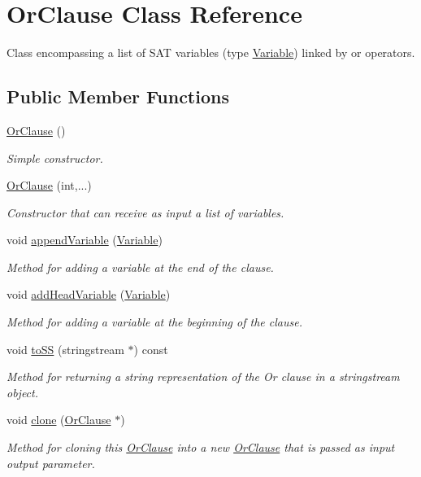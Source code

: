 \hypertarget{classOrClause}{\section{Or\-Clause Class Reference}
\label{classOrClause}
}


Class encompassing a list of S\-A\-T variables (type {\ttfamily \hyperlink{classVariable}{Variable}}) linked by or operators.  


\subsection*{Public Member Functions}
\begin{DoxyCompactItemize}
\item 
\hyperlink{classOrClause_a4631acd310d445535a08e84d51c84f6e}{Or\-Clause} ()
\begin{DoxyCompactList}\small\item\em Simple constructor. \end{DoxyCompactList}\item 
\hyperlink{classOrClause_ae85000bdcd5e0c96cb5369cf4d59240e}{Or\-Clause} (int,...)
\begin{DoxyCompactList}\small\item\em Constructor that can receive as input a list of variables. \end{DoxyCompactList}\item 
void \hyperlink{classOrClause_a09a95fb8ce2a1d10ae7c22295265725c}{append\-Variable} (\hyperlink{classVariable}{Variable})
\begin{DoxyCompactList}\small\item\em Method for adding a variable at the end of the clause. \end{DoxyCompactList}\item 
void \hyperlink{classOrClause_a3ad02fa758db9d8b4a432e4c5ee7638e}{add\-Head\-Variable} (\hyperlink{classVariable}{Variable})
\begin{DoxyCompactList}\small\item\em Method for adding a variable at the beginning of the clause. \end{DoxyCompactList}\item 
void \hyperlink{classOrClause_a4602e98acda51523bf55cc2ca1d59ad6}{to\-S\-S} (stringstream $\ast$) const 
\begin{DoxyCompactList}\small\item\em Method for returning a string representation of the Or clause in a {\ttfamily stringstream} object. \end{DoxyCompactList}\item 
void \hyperlink{classOrClause_ae8edb2f491a3b4f5d8bd402ef1788d82}{clone} (\hyperlink{classOrClause}{Or\-Clause} $\ast$)
\begin{DoxyCompactList}\small\item\em Method for cloning this \hyperlink{classOrClause}{Or\-Clause} into a new \hyperlink{classOrClause}{Or\-Clause} that is passed as input output parameter. \end{DoxyCompactList}\end{DoxyCompactItemize}


